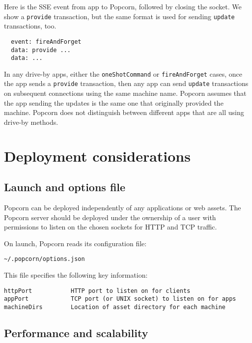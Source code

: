 \documentclass[12pt]{article}
\begin{document}
Here is the SSE event from app to Popcorn, followed by closing the
socket. We show a \verb`provide` transaction, but the same format is used
for sending \verb`update` transactions, too.

\begin{verbatim}
  event: fireAndForget
  data: provide ...
  data: ...

\end{verbatim}

In any drive-by apps, either the \verb`oneShotCommand` or \verb`fireAndForget`
cases, once the app sends a \verb`provide` transaction, then any app can
send \verb`update` transactions on subsequent connections using the same
machine name. Popcorn assumes that the app sending the updates is the
same one that originally provided the machine. Popcorn does not
distinguish between different apps that are all using drive-by
methods.


\section{Deployment considerations}

\subsection{Launch and options file}

Popcorn can be deployed independently of any applications or web
assets. The Popcorn server should be deployed under the ownership of a
user with permissions to listen on the chosen sockets for HTTP and TCP
traffic.

On launch, Popcorn reads its configuration file:

\begin{verbatim}
~/.popcorn/options.json
\end{verbatim}

This file specifies the following key information:

\begin{verbatim}
httpPort           HTTP port to listen on for clients
appPort            TCP port (or UNIX socket) to listen on for apps
machineDirs        Location of asset directory for each machine
\end{verbatim}

\subsection{Performance and scalability}
\end{document}
